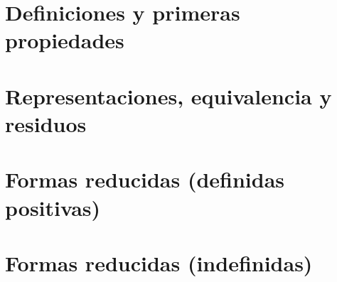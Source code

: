 \section{Definiciones y primeras propiedades}\label{sec:definiciones}


\section{Representaciones, equivalencia y residuos}\label{sec:representaciones}


\section{Formas reducidas (definidas positivas)}\label{sec:definidas}


\section{Formas reducidas (indefinidas)}\label{sec:indefinidas}


